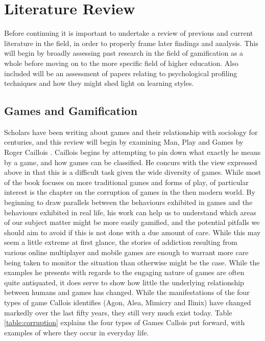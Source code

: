 \documentclass[12pt,a4paper,twoside]{report}
\begin{document}
\chapter{Literature Review}
\label{sec:lit}
Before continuing it is important to undertake a review of previous and current literature in the field, in order to properly frame later findings and analysis. This will begin by broadly assessing past research in the field of gamification as a whole before moving on to the more specific field of higher education. Also included will be an assessment of papers relating to psychological profiling techniques and how they might shed light on learning styles.

\section{Games and Gamification}
Scholars have been writing about games and their relationship with sociology for centuries, and this review will begin by examining Man, Play and Games by Roger Caillois \cite{caillois1961man}. Caillois begins by attempting to pin down what exactly he means by a game, and how games can be classified. He concurs with the view expressed above in that this is a difficult task given the wide diversity of games. While most of the book focuses on more traditional games and forms of play, of particular interest is the chapter on the corruption of games in the then modern world. By beginning to draw parallels between the behaviours exhibited in games and the behaviours exhibited in real life, his work can help us to understand which areas of our subject matter might be more easily gamified, and the potential pitfalls we should aim to avoid if this is not done with a due amount of care. While this may seem a little extreme at first glance, the stories of addiction resulting from various online multiplayer and mobile games are enough to warrant more care being taken to monitor the situation than otherwise might be the case. While the examples he presents with regards to the engaging nature of games are often quite antiquated, it does serve to show how little the underlying relationship between humans and games has changed. While the manifestations of the four types of game Callois identifies (Agon, Alea, Mimicry and Ilinix) have changed markedly over the last fifty years, they still very much exist today. Table \ref{table:corruption} explains the four types of Games Callois put forward, with examples of where they occur in everyday life.
\end{document}
